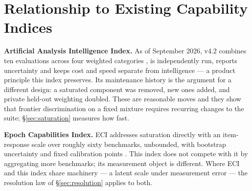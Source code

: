 \section{Relationship to Existing Capability Indices}\label{sec:related}

\textbf{Artificial Analysis Intelligence Index.} As of September 2026, v4.2 combines ten evaluations across four weighted categories \citep{aa2026index}, is independently run, reports uncertainty and keeps cost and speed separate from intelligence --- a product principle this index preserves. Its maintenance history is the argument for a different design: a saturated component was removed, new ones added, and private held-out weighting doubled. These are reasonable moves and they show that frontier discrimination on a fixed mixture requires recurring changes to the suite; \S\ref{sec:saturation} measures how fast.

\textbf{Epoch Capabilities Index.} ECI addresses saturation directly with an item-response scale over roughly sixty benchmarks, unbounded, with bootstrap uncertainty and fixed calibration points \citep{epoch2026eci}. This index does not compete with it by aggregating more benchmarks; its measurement object is different. Where ECI and this index share machinery --- a latent scale under measurement error --- the resolution law of \S\ref{sec:resolution} applies to both.

